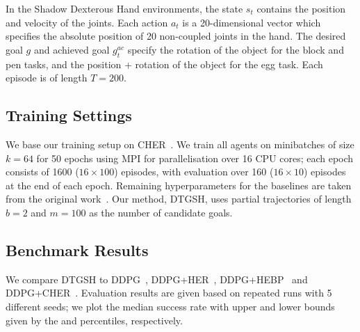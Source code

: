 In the Shadow Dexterous Hand environments, the state $s_{t}$ contains the position and velocity of the joints. Each action $a_{t}$ is a 20-dimensional vector which specifies the absolute position of 20 non-coupled joints in the hand. The desired goal $g$ and achieved goal $g^{ac}_t$ specify the rotation of the object for the block and pen tasks, and the position + rotation of the object for the egg task. Each episode is of length $T = 200$.

\subsection{Training Settings}
We base our training setup on CHER~\cite{fang2019curriculum}. We train all agents on minibatches of size $k = 64$ for 50 epochs using MPI for parallelisation over 16 CPU cores; each epoch consists of 1600 ($16 \times 100$) episodes, with evaluation over 160 ($16 \times 10$) episodes at the end of each epoch. Remaining hyperparameters for the baselines are taken from the original work~\cite{NIPS2017_453fadbd,fang2019curriculum,zhao2018energy}. Our method, DTGSH, uses partial trajectories of length $b = 2$ and $m = 100$ as the number of candidate goals. 


\subsection{Benchmark Results}
We compare DTGSH to DDPG~\cite{lillicrapContinuous}, DDPG+HER~\cite{NIPS2017_453fadbd}, DDPG+HEBP~\cite{zhao2018energy} and DDPG+CHER~\cite{fang2019curriculum}. Evaluation results are given based on repeated runs with 5 different seeds; we plot the median success rate with upper and lower bounds given by the  and  percentiles, respectively.


